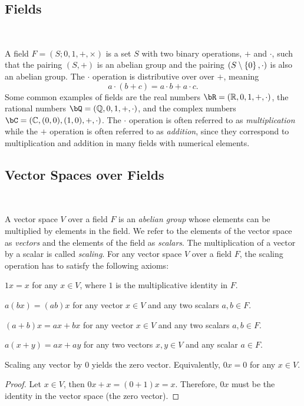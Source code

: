 \newpage
\subsection{Fields}~\label{sec:def-fields}

A field $F = (S; 0, 1, +, \times)$ is a set $S$ with two binary operations, $+$ and $\cdot$,
such that the pairing $(S, +)$ is an abelian group
and the pairing $(S \setminus \left\{ 0 \right\}, \cdot)$ is also an abelian group.
The $\cdot$ operation is distributive over over $+$, meaning
\[ a \cdot (b + c) = a \cdot b + a \cdot c. \]
Some common examples of fields are the real numbers $\bR = (\R, 0, 1, +, \cdot)$,
the rational numbers $\bQ = (\Q, 0, 1, +, \cdot)$,
and the complex numbers $\bC = (\C, (0, 0), (1, 0), +, \cdot)$.
The $\cdot$ operation is often referred to as \emph{multiplication}
while the $+$ operation is often referred to as \emph{addition},
since they correspond to multiplication and addition in many fields with numerical elements.


\subsection{Vector Spaces over Fields}~\label{sec:def-vector-spaces}

A vector space $V$ over a field $F$ is an \emph{abelian group}
whose elements can be multiplied by elements in the field.
We refer to the elements of the vector space as \emph{vectors}
and the elements of the field as \emph{scalars}.
The multiplication of a vector by a scalar is called \emph{scaling}.
For any vector space $V$ over a field $F$, the scaling operation
has to satisfy the following axioms:
\begin{enumroman}
  \item $1 x = x$ for any $x \in V$, where $1$ is the multiplicative identity in $F$.
  \item $a(bx) = (ab)x$ for any vector $x \in V$ and any two scalars $a, b \in F$.
  \item $(a+b)x = ax + bx$ for any vector $x \in V$ and any two scalars $a, b \in F$.
  \item $a(x+y) = ax + ay$ for any two vectors $x, y \in V$ and any scalar $a \in F$.
\end{enumroman}

\begin{corollary}
  Scaling any vector by $0$ yields the zero vector.
  Equivalently, $0x = 0$ for any $x \in V$.

  \begin{proof}
    Let $x \in V$, then $0x + x = (0 + 1)x = x$.
    Therefore, $0x$ must be the identity in the vector space
    (the zero vector).
  \end{proof}
\end{corollary}

